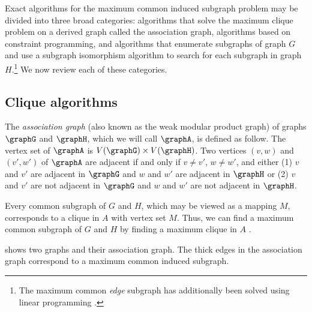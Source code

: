 Exact algorithms for the maximum common induced subgraph problem may be divided
into three broad categories: algorithms that solve the maximum clique problem
on a derived graph called the association graph, algorithms based on constraint
programming, and algorithms that enumerate subgraphs of graph $G$ and use a
subgraph isomorphism algorithm to search for each subgraph in graph
$H$.\footnote{The maximum common \emph{edge} subgraph has additionally been
solved using linear programming
\citep{marenco1999algoritmo,DBLP:journals/dam/BahienseMPS12}.} We now review
each of these categories.

\subsection{Clique algorithms}\label{subsec:clique-algorithms}

The \emph{association graph} (also known as the weak modular product graph)
of graphs $\graphG$ and $\graphH$, which we will call
$\graphA$, is defined as follow.  The vertex set of $\graphA$ is $V(\graphG)
\times V(\graphH)$.  Two vertices $(v,w)$ and $(v',w')$ of $\graphA$ are
adjacent if and only if $v \not= v'$, $w \not= w'$, and either (1) $v$ and $v'$
are adjacent in $\graphG$ and $w$ and $w'$ are adjacent in $\graphH$ or (2) $v$
and $v'$ are not adjacent in $\graphG$ and $w$ and $w'$ are not adjacent in
$\graphH$.

Every common subgraph of $G$ and $H$, which may be viewed as a mapping $M$,
corresponds to a clique in $A$ with vertex set $M$.  Thus, we can find
a maximum common subgraph of $G$ and $H$ by finding a maximum clique in $A$
\citep{LeviG}.

 shows two graphs and their association graph.
The thick edges in the association graph correspond to a maximum common
induced subgraph.

